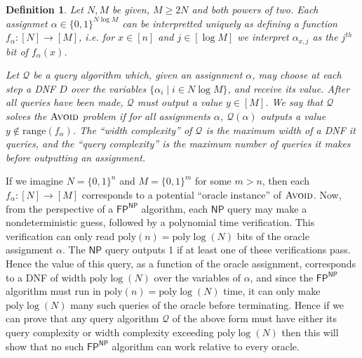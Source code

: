 \documentclass[11pt]{article}
\newtheorem{definition}{Definition}
\newcommand{\B}{\{0,1\}}
\newcommand{\poly}{\mathrm{poly}}
\newcommand{\avoid}{\textsc{Avoid}}
\begin{document}
\begin{definition}
Let $N,M$ be given, $M \geq 2N$ and both powers of two. Each assignmet $\alpha \in \B^{N \log M}$ can be interpretted uniquely as defining a function $f_{\alpha}:[N] \to [M]$, i.e. for $x \in [n]$ and $j \in [\log M]$ we interpret $\alpha_{x,j}$ as the $j^{th}$ bit of $f_{\alpha}(x)$. 


Let $\mathcal{Q}$ be a query algorithm which, given an assignment $\alpha$, may choose at each step a DNF $D$ over the variables $\{\alpha_i \mid i \in N \log M\}$, and receive its value. After all queries have been made, $\mathcal{Q}$ must output a value $y \in [M]$. We say that $\mathcal{Q}$ solves the $\avoid$ problem if for all assignments $\alpha$, $\mathcal{Q}(\alpha)$ outputs a value $y \notin \mathrm{range}(f_{\alpha})$. The ``width complexity'' of $\mathcal{Q}$ is the maximum width of a DNF it queries, and the ``query complexity'' is the maximum number of queries it makes before outputting an assignment.
\end{definition}

If we imagine $N = \B^n$ and $M = \B^{m}$ for some $m > n$, then each $f_{\alpha} : [N] \to [M]$ corresponds to a potential ``oracle instance'' of $\avoid$. Now, from the perspective of a $\mathsf{FP^{NP}}$ algorithm, each $\mathsf{NP}$ query may make a nondeterministic guess, followed by a polynomial time verification. This verification can only read $\poly(n) = \poly\log(N)$ bits of the oracle assignment $\alpha$. The $\mathsf{NP}$ query outputs 1 if at least one of these verifications pass. Hence the value of this query, as a function of the oracle assignment, corresponds to a DNF of width $\poly\log(N)$ over the variables of $\alpha$, and since the $\mathsf{FP^{NP}}$ algorithm must run in $\poly(n) = \poly\log(N)$ time, it can only make $\poly\log(N)$ many such queries of the oracle before terminating. Hence if we can prove that any query algorithm $\mathcal{Q}$ of the above form must have either its query complexity or width complexity exceeding $\poly\log(N)$ then this will show that no such $\mathsf{FP^{NP}}$ algorithm can work relative to every oracle.
\end{document}
